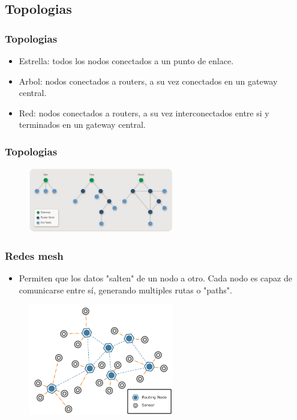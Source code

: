 \documentclass{beamer}
\begin{document}
\subsection{Topologias}

\begin{frame}
\frametitle{Topologias}
\begin{itemize}
\item Estrella: todos los nodos conectados a un punto de enlace.
\item Arbol: nodos conectados a routers, a su vez conectados en un gateway central.
\item Red: nodos conectados a routers, a su vez interconectados entre si y terminados en un gateway central.
\end{itemize}
\frametitle{Topologias}
\begin{figure}[!h]
\centering
\includegraphics[width=2.5in]{topologias}
\end{figure}
\end{frame}

\begin{frame}
\frametitle{Redes mesh}
\begin{itemize}
\item Permiten que los datos "salten" de un nodo a otro. Cada nodo es capaz de comunicarse entre sí, generando multiples rutas o "paths".
\end{itemize}
\begin{figure}[!h]
\centering
\includegraphics[width=2.5in]{wsn}
\end{figure}
\end{frame}
\end{document}
